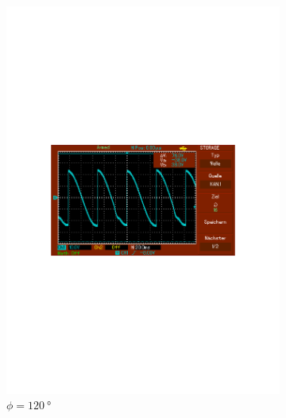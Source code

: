 \begin{figure}
\begin{subfigure}{0.3\textwidth}
      \includegraphics[width=\textwidth]{Daten/noNoise/120.pdf}
      \caption{$\phi = \SI{120}{\degree}$}
      \label{fig:120}
  \end{subfigure}
  \begin{subfigure}{0.3\textwidth}
      \centering

\end{subfigure}
\end{figure}
